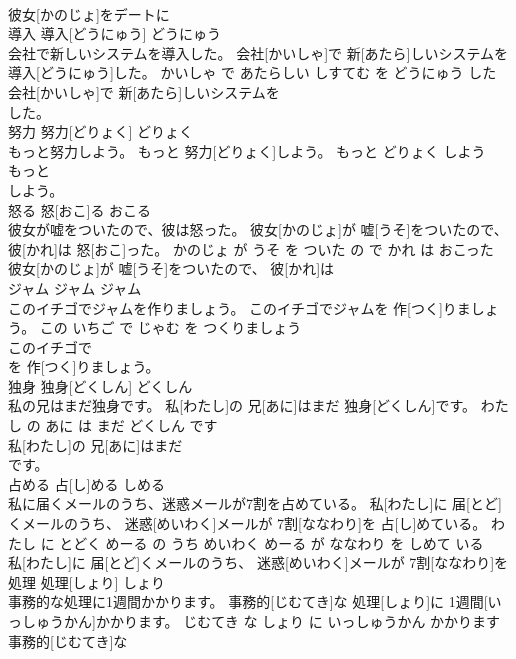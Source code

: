 \documentclass[8pt]{extreport}
\begin{document}
\begin{CJK}{UTF8}{min}
\\	彼女[かのじょ]をデートに
\\	導入	導入[どうにゅう]	どうにゅう	
\\	会社で新しいシステムを導入した。	会社[かいしゃ]で 新[あたら]しいシステムを 導入[どうにゅう]した。	かいしゃ で あたらしい しすてむ を どうにゅう した	
\\	会社[かいしゃ]で 新[あたら]しいシステムを
\\	した。			
\\	努力	努力[どりょく]	どりょく	
\\	もっと努力しよう。	もっと 努力[どりょく]しよう。	もっと どりょく しよう	
\\	もっと
\\	しよう。			
\\	怒る	怒[おこ]る	おこる	
\\	彼女が嘘をついたので、彼は怒った。	彼女[かのじょ]が 嘘[うそ]をついたので、 彼[かれ]は 怒[おこ]った。	かのじょ が うそ を ついた の で かれ は おこった	
\\	彼女[かのじょ]が 嘘[うそ]をついたので、 彼[かれ]は
\\	ジャム	ジャム	ジャム	
\\	このイチゴでジャムを作りましょう。	このイチゴでジャムを 作[つく]りましょう。	この いちご で じゃむ を つくりましょう	
\\	このイチゴで
\\	を 作[つく]りましょう。			
\\	独身	独身[どくしん]	どくしん	
\\	私の兄はまだ独身です。	私[わたし]の 兄[あに]はまだ 独身[どくしん]です。	わたし の あに は まだ どくしん です	
\\	私[わたし]の 兄[あに]はまだ
\\	です。			
\\	占める	占[し]める	しめる	
\\	私に届くメールのうち、迷惑メールが7割を占めている。	私[わたし]に 届[とど]くメールのうち、 迷惑[めいわく]メールが 7割[ななわり]を 占[し]めている。	わたし に とどく めーる の うち めいわく めーる が ななわり を しめて いる	
\\	私[わたし]に 届[とど]くメールのうち、 迷惑[めいわく]メールが 7割[ななわり]を
\\	処理	処理[しょり]	しょり	
\\	事務的な処理に1週間かかります。	事務的[じむてき]な 処理[しょり]に 1週間[いっしゅうかん]かかります。	じむてき な しょり に いっしゅうかん かかります	
\\	事務的[じむてき]な

\end{CJK}
\end{document}
